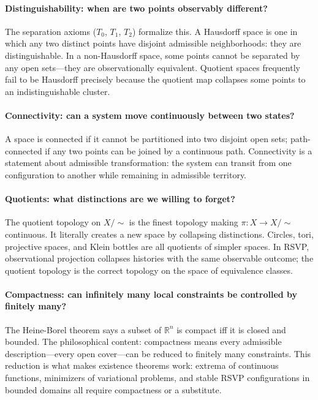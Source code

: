 \documentclass[12pt, twoside, openright, a4paper]{book}
\newcommand{\R}{\mathbb{R}}
\begin{document}
\paragraph{Distinguishability: when are two points observably different?}
The separation axioms ($T_0$, $T_1$, $T_2$) formalize this.
A Hausdorff space is one in which any two distinct points have disjoint admissible neighborhoods: they are distinguishable.
In a non-Hausdorff space, some points cannot be separated by any open sets---they are observationally equivalent.
Quotient spaces frequently fail to be Hausdorff precisely because the quotient map collapses some points to an indistinguishable cluster.

\paragraph{Connectivity: can a system move continuously between two states?}
A space is connected if it cannot be partitioned into two disjoint open sets; path-connected if any two points can be joined by a continuous path.
Connectivity is a statement about admissible transformation: the system can transit from one configuration to another while remaining in admissible territory.

\paragraph{Quotients: what distinctions are we willing to forget?}
The quotient topology on $X/{\sim}$ is the finest topology making $\pi: X \to X/{\sim}$ continuous.
It literally creates a new space by collapsing distinctions.
Circles, tori, projective spaces, and Klein bottles are all quotients of simpler spaces.
In RSVP, observational projection collapses histories with the same observable outcome; the quotient topology is the correct topology on the space of equivalence classes.

\paragraph{Compactness: can infinitely many local constraints be controlled by finitely many?}
The Heine-Borel theorem says a subset of $\R^n$ is compact iff it is closed and bounded.
The philosophical content: compactness means every admissible description---every open cover---can be reduced to finitely many constraints.
This reduction is what makes existence theorems work: extrema of continuous functions, minimizers of variational problems, and stable RSVP configurations in bounded domains all require compactness or a substitute.
\end{document}
